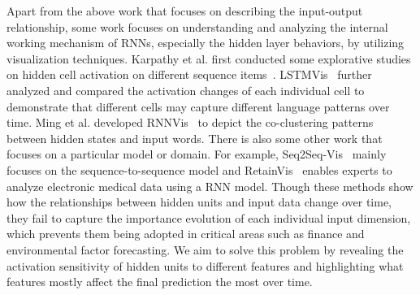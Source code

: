 Apart from the above work that focuses on describing the input-output relationship,
some work focuses on understanding and analyzing the internal working mechanism of RNNs, especially the hidden layer behaviors, by utilizing visualization techniques.
Karpathy et al. first conducted some explorative studies on hidden cell activation on different sequence items~\cite{karpathy2015visualizing}.
LSTMVis~\cite{strobelt2018lstmvis} further analyzed and compared the activation changes of each individual cell to demonstrate that different cells may capture different language patterns over time.
Ming et al. developed RNNVis~\cite{ming2017understanding} to depict the co-clustering patterns between hidden states and input words.
There is also some other work that focuses on a particular model or domain.
For example, Seq2Seq-Vis~\cite{strobelt2019s} mainly focuses on the sequence-to-sequence model and RetainVis~\cite{kwon2019retainvis} enables experts to analyze electronic medical data using a RNN model.
Though these methods show how the relationships between hidden units and input data change over time, they fail to capture the importance evolution of each individual input dimension, which prevents them being adopted in critical areas such as finance and environmental factor forecasting.
We aim to solve this problem by revealing the activation sensitivity of hidden units to different features and highlighting what features mostly affect the final prediction the most over time.

